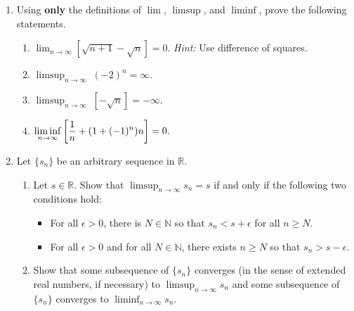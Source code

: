 \documentclass[12pt, letterpaper]{article}
\newcommand{\0}{\mathbf{0}}
\newcommand{\1}{\mathbf{1}}
\begin{document}
\begin{enumerate}
\begin{enumerate}
    \end{enumerate}

    \vspace{0.5cm}

    \item 
    Using \textbf{only} the definitions of $\lim$, $\limsup$, and $\liminf$, prove the following statements.
    \begin{enumerate}
        \item 
        $\displaystyle{\lim_{n \to \infty} \left[\sqrt{n + 1} - \sqrt{n}\right] = 0}.$ \quad \textit{Hint:} Use difference of squares.\\

        \item 
        $\displaystyle{\limsup_{n \to \infty} \; (-2)^n = \infty}$.\\

        \item 
        $\displaystyle{\limsup_{n \to \infty} \; \left[-\sqrt{n}\right]} = -\infty.$\\
        

        \item 
        $\displaystyle{\liminf_{n \to \infty} \left[\frac{1}{n} + (1 + (-1)^n)n\right] = 0}.\\$
        
    \end{enumerate}

    \newpage

    \item 
    Let $\{s_n\}$ be an arbitrary sequence in $\mathbb{R}$.
    \begin{enumerate}
        \item 
        Let $s \in \mathbb{R}$. Show that $\displaystyle{\limsup_{n \to \infty} s_n = s}$ if and only if the following two conditions hold:
        \begin{itemize}
            \item 
            For all $\epsilon > 0$, there is $N \in \mathbb{N}$ so that $s_n < s + \epsilon$ for all $n \geq N$.

            \item 
            For all $\epsilon > 0$ and for all $N \in \mathbb{N}$, there exists $n \geq N$ so that $s_n > s - \epsilon$.\\
        \end{itemize}
        
        \item 
        Show that some subsequence of $\{s_n\}$ converges (in the sense of extended real numbers, if necessary) to $\displaystyle{\limsup_{n \to \infty} s_n}$ and some subsequence of $\{s_n\}$ converges to $\displaystyle{\liminf_{n \to \infty} s_n}$.\\


\end{enumerate}
\end{enumerate}
\end{document}
